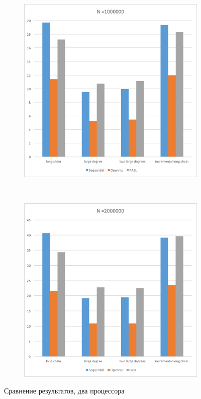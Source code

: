 \documentclass[specification,annotation,times]{itmo-student-thesis}
\begin{document}
\begin{figure}[!ht]
\begin{subfigure}[b]{0.45\textwidth}
\end{subfigure}\\
\begin{subfigure}[b]{0.45\textwidth}
    \includegraphics[width=\textwidth]{pic/results-2-c.png}
\end{subfigure}~~\begin{subfigure}[b]{0.45\textwidth}
    \includegraphics[width=\textwidth]{pic/results-2-d.png}
\end{subfigure}
\caption{Сравнение результатов, два процессора}\label{fig:results-comparison-2}
\end{figure}
\end{document}
